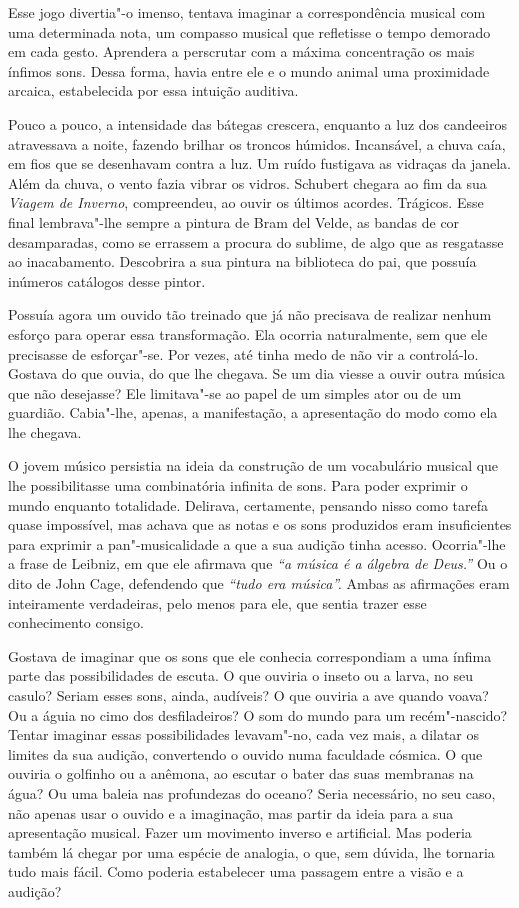 Esse jogo divertia"-o imenso, tentava imaginar a correspondência musical
com uma determinada nota, um compasso musical que refletisse o tempo
demorado em cada gesto. Aprendera a perscrutar com a máxima concentração
os mais ínfimos sons. Dessa forma, havia entre ele e o mundo animal uma
proximidade arcaica, estabelecida por essa intuição auditiva.

Pouco a pouco, a intensidade das bátegas crescera, enquanto a luz dos
candeeiros atravessava a noite, fazendo brilhar os troncos húmidos.
Incansável, a chuva caía, em fios que se desenhavam contra a luz. Um
ruído fustigava as vidraças da janela. Além da chuva, o vento fazia
vibrar os vidros. Schubert chegara ao fim da sua \emph{Viagem de
Inverno}, compreendeu, ao ouvir os últimos acordes. Trágicos. Esse final
lembrava"-lhe sempre a pintura de Bram del Velde, as bandas de cor
desamparadas, como se errassem a procura do sublime, de algo que as
resgatasse ao inacabamento. Descobrira a sua pintura na biblioteca do
pai, que possuía inúmeros catálogos desse pintor.

Possuía agora um ouvido tão treinado que já não precisava de realizar
nenhum esforço para operar essa transformação. Ela ocorria naturalmente,
sem que ele precisasse de esforçar"-se. Por vezes, até tinha medo de não
vir a controlá-lo. Gostava do que ouvia, do que lhe chegava. Se um dia
viesse a ouvir outra música que não desejasse? Ele limitava"-se ao papel
de um simples ator ou de um guardião. Cabia"-lhe, apenas, a
manifestação, a apresentação do modo como ela lhe chegava.

O jovem músico persistia na ideia da construção de um vocabulário
musical que lhe possibilitasse uma combinatória infinita de sons. Para
poder exprimir o mundo enquanto totalidade. Delirava, certamente,
pensando nisso como tarefa quase impossível, mas achava que as notas e
os sons produzidos eram insuficientes para exprimir a pan"-musicalidade a
que a sua audição tinha acesso. Ocorria"-lhe a frase de Leibniz, em que
ele afirmava que \emph{``a música é a álgebra de Deus.''} Ou o dito de
John Cage, defendendo que \emph{``tudo era música''.} Ambas as
afirmações eram inteiramente verdadeiras, pelo menos para ele, que
sentia trazer esse conhecimento consigo.

Gostava de imaginar que os sons que ele conhecia correspondiam a uma
ínfima parte das possibilidades de escuta. O que ouviria o inseto ou a
larva, no seu casulo? Seriam esses sons, ainda, audíveis? O que ouviria
a ave quando voava? Ou a águia no cimo dos desfiladeiros? O som do mundo
para um recém"-nascido? Tentar imaginar essas possibilidades levavam"-no,
cada vez mais, a dilatar os limites da sua audição, convertendo o ouvido
numa faculdade cósmica. O que ouviria o golfinho ou a anêmona, ao
escutar o bater das suas membranas na água? Ou uma baleia nas
profundezas do oceano? Seria necessário, no seu caso, não apenas usar o
ouvido e a imaginação, mas partir da ideia para a sua apresentação
musical. Fazer um movimento inverso e artificial. Mas poderia também lá
chegar por uma espécie de analogia, o que, sem dúvida, lhe tornaria tudo
mais fácil. Como poderia estabelecer uma passagem entre a visão e a
audição?

